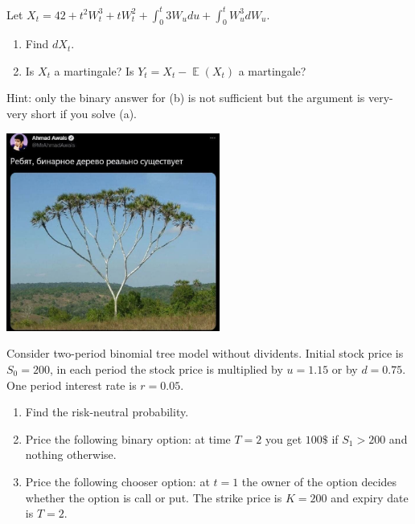 \documentclass[12pt]{article}
\DeclareMathOperator{\E}{\mathbb{E}}
\begin{document}
\begin{enumerate}
\item Let $X_t = 42 + t^2W_t^3 + tW_t^2 + \int_0^t 3W_u du + \int_0^t W_u^3 dW_u$.
\begin{enumerate}
  \item Find $dX_t$.
  \item Is $X_t$ a martingale? Is $Y_t = X_t - \E(X_t)$ a martingale? 
\end{enumerate}

Hint: only the binary answer for (b) is not sufficient but the argument is very-very short if you solve (a). 




\begin{minipage}{0.42\linewidth}
  \includegraphics[width=7cm]{tree.jpg}  
\end{minipage}
%
\begin{minipage}{0.58\linewidth}
  \item Consider two-period binomial tree model without dividents.
  Initial stock price is $S_0 = 200$, 
  in each period the stock price is multiplied by $u=1.15$ or by $d=0.75$. 
  One period interest rate is $r=0.05$. 
  
  \begin{enumerate}
  \item Find the risk-neutral probability. 
  \item Price the following binary option: at time $T=2$ you get $100\$ $ if $S_1 > 200$ and nothing otherwise. 
  \item Price the following chooser option: at $t=1$ the owner 
  of the option decides whether the option is call or put. The strike price 
  is $K=200$ and expiry date is $T=2$. 
  \end{enumerate}
  \end{minipage}




\end{enumerate}
\end{document}
